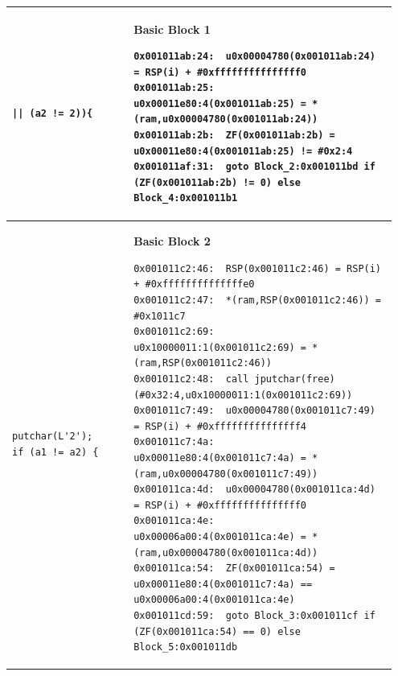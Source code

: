 \begin{longtable}{|p{0.30\linewidth}|p{0.65\linewidth}|}
    \begin{minipage}[t]{\linewidth}
        \vspace{1mm}
        \begin{lstlisting}[style=CStyle]
|| (a2 != 2)){
        \end{lstlisting}
        \vspace{1mm}
    \end{minipage}
    & 
    \begin{minipage}[t]{\linewidth}
        \vspace{1mm}
        \textbf{\scriptsize Basic Block 1}
        \begin{lstlisting}[style=PCodeStyle]
0x001011ab:24:	u0x00004780(0x001011ab:24) = RSP(i) + #0xfffffffffffffff0
0x001011ab:25:	u0x00011e80:4(0x001011ab:25) = *(ram,u0x00004780(0x001011ab:24))
0x001011ab:2b:	ZF(0x001011ab:2b) = u0x00011e80:4(0x001011ab:25) != #0x2:4
0x001011af:31:	goto Block_2:0x001011bd if (ZF(0x001011ab:2b) != 0) else Block_4:0x001011b1
        \end{lstlisting}
        \vspace{1mm}
    \end{minipage}
    \\ \hline

    \begin{minipage}[t]{\linewidth}
        \vspace{1mm}
        \begin{lstlisting}[style=CStyle]
putchar(L'2');
if (a1 != a2) {
        \end{lstlisting}
        \vspace{1mm}
    \end{minipage}
    & 
    \begin{minipage}[t]{\linewidth}
        \vspace{1mm}
        \textbf{\scriptsize Basic Block 2}
        \begin{lstlisting}[style=PCodeStyle]
0x001011c2:46:	RSP(0x001011c2:46) = RSP(i) + #0xffffffffffffffe0
0x001011c2:47:	*(ram,RSP(0x001011c2:46)) = #0x1011c7
0x001011c2:69:	u0x10000011:1(0x001011c2:69) = *(ram,RSP(0x001011c2:46))
0x001011c2:48:	call jputchar(free)(#0x32:4,u0x10000011:1(0x001011c2:69))
0x001011c7:49:	u0x00004780(0x001011c7:49) = RSP(i) + #0xfffffffffffffff4
0x001011c7:4a:	u0x00011e80:4(0x001011c7:4a) = *(ram,u0x00004780(0x001011c7:49))
0x001011ca:4d:	u0x00004780(0x001011ca:4d) = RSP(i) + #0xfffffffffffffff0
0x001011ca:4e:	u0x00006a00:4(0x001011ca:4e) = *(ram,u0x00004780(0x001011ca:4d))
0x001011ca:54:	ZF(0x001011ca:54) = u0x00011e80:4(0x001011c7:4a) == u0x00006a00:4(0x001011ca:4e)
0x001011cd:59:	goto Block_3:0x001011cf if (ZF(0x001011ca:54) == 0) else Block_5:0x001011db
        \end{lstlisting}
        \vspace{1mm}
    \end{minipage}
    \\ \hline


\end{longtable}
